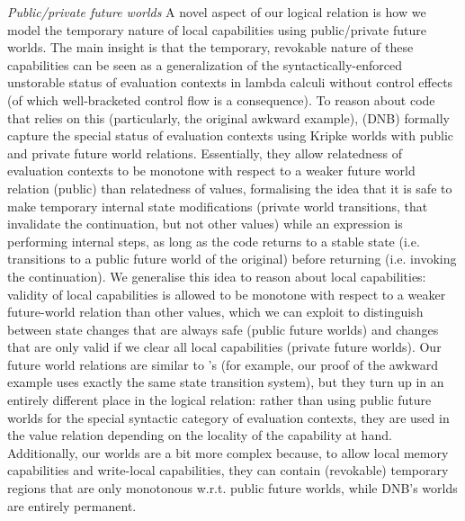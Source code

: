 \documentclass[compsoc,conference,letterpaper,fleqn]{IEEEtran}
\newcommand\lau[1]{{\color{purple} \sf \footnotesize {LS: #1}}\\}
\renewcommand\lau[1]{}
\begin{document}
\emph{Public/private future worlds} A novel aspect of our logical relation is
how we model the temporary nature of local capabilities using public/private
future worlds. The main insight is that the temporary, revokable nature of these
capabilities can be seen as a generalization of the syntactically-enforced
unstorable status of evaluation contexts in lambda calculi without control
effects (of which well-bracketed control flow is a consequence). To reason about
code that relies on this (particularly, the original awkward example),
\citet{Dreyer:jfp12} (DNB) formally capture the special status of evaluation
contexts using Kripke worlds with public and private future world relations.
Essentially, they allow relatedness of evaluation contexts to be monotone with
respect to a weaker future world relation (public) than relatedness of values,
formalising the idea that it is safe to make temporary internal state
modifications (private world transitions, that invalidate the continuation,
but not other values) while an expression is performing internal steps, as long
as the code returns to a stable state (i.e. transitions to a public future world
of the original) before returning (i.e. invoking the continuation).\lau{I feel there is an awful lot of parentheses here and that some of them might not be strictly necessary (like explaining temporary internal state modifications and returning = invoking the continuation). Dominique, could you decide whether they are essential to stay true to the contents of the cited paper.}
We
generalise this idea to reason about local capabilities: validity of local
capabilities is allowed to be monotone with respect to a weaker future-world
relation than other values, which we can exploit to distinguish between state
changes that are always safe (public future worlds) and changes that are only
valid if we clear all local capabilities (private future worlds). Our future
world relations are similar to \citet{Dreyer:jfp12}'s (for example, our proof of
the awkward example uses exactly the same state transition system),
but they turn up in an entirely different place in the logical relation: rather
than using public future worlds for the special syntactic category of evaluation
contexts, they are used in the value relation depending on the
locality of the capability at hand. Additionally, our worlds are a bit more
complex because, to allow local memory capabilities and write-local
capabilities, they can contain (revokable) temporary regions that are only
monotonous w.r.t. public future worlds, while DNB's worlds are entirely
permanent.
\end{document}

